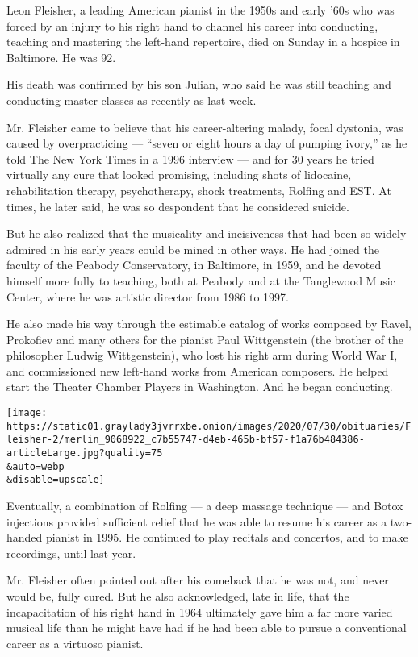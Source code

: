 Leon Fleisher, a leading American pianist in the 1950s and early '60s
who was forced by an injury to his right hand to channel his career into
conducting, teaching and mastering the left-hand repertoire, died on
Sunday in a hospice in Baltimore. He was 92.

His death was confirmed by his son Julian, who said he was still
teaching and conducting master classes as recently as last week.

Mr. Fleisher came to believe that his career-altering malady, focal
dystonia, was caused by overpracticing --- ``seven or eight hours a day
of pumping ivory,'' as he told The New York Times in a 1996 interview
--- and for 30 years he tried virtually any cure that looked promising,
including shots of lidocaine, rehabilitation therapy, psychotherapy,
shock treatments, Rolfing and EST. At times, he later said, he was so
despondent that he considered suicide.

But he also realized that the musicality and incisiveness that had been
so widely admired in his early years could be mined in other ways. He
had joined the faculty of the Peabody Conservatory, in Baltimore, in
1959, and he devoted himself more fully to teaching, both at Peabody and
at the Tanglewood Music Center, where he was artistic director from 1986
to 1997.

He also made his way through the estimable catalog of works composed by
Ravel, Prokofiev and many others for the pianist Paul Wittgenstein (the
brother of the philosopher Ludwig Wittgenstein), who lost his right arm
during World War I, and commissioned new left-hand works from American
composers. He helped start the Theater Chamber Players in Washington.
And he began conducting.

\texttt{[image: https://static01.graylady3jvrrxbe.onion/images/2020/07/30/obituaries/Fleisher-2/merlin\_9068922\_c7b55747-d4eb-465b-bf57-f1a76b484386-articleLarge.jpg?quality=75\\\&auto=webp\\\&disable=upscale]}

Eventually, a combination of Rolfing --- a deep massage technique ---
and Botox injections provided sufficient relief that he was able to
resume his career as a two-handed pianist in 1995. He continued to play
recitals and concertos, and to make recordings, until last year.

Mr. Fleisher often pointed out after his comeback that he was not, and
never would be, fully cured. But he also acknowledged, late in life,
that the incapacitation of his right hand in 1964 ultimately gave him a
far more varied musical life than he might have had if he had been able
to pursue a conventional career as a virtuoso pianist.

